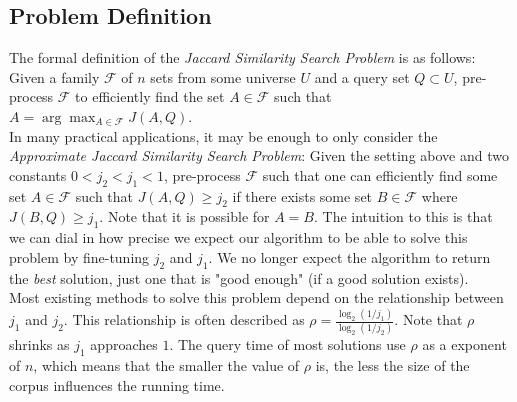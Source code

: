 \subsection{Problem Definition}
The formal definition of the \textit{Jaccard Similarity Search Problem} is as follows:
Given a family $\mathcal{F}$ of $n$ sets from some universe $U$ and a query set $Q\subset U$, pre-process $\mathcal{F}$ to efficiently find the set $A\in \mathcal{F}$ such that $A = \arg\max_{A\in \mathcal{F}}J(A,Q)$. \\
In many practical applications, it may be enough to only consider the \textit{Approximate Jaccard Similarity Search Problem}: Given the setting above and two constants $0 < j_2 < j_1 < 1$, pre-process $\mathcal{F}$ such that one can efficiently find some set $A \in \mathcal{F}$ such that $J(A,Q) \geq j_2$ if there exists some set $B \in \mathcal{F}$ where $J(B,Q) \geq j_1$. Note that it is possible for $A = B$. The intuition to this is that we can dial in how precise we expect our algorithm to be able to solve this problem by fine-tuning $j_2$ and $j_1$. We no longer expect the algorithm to return the \textit{best} solution, just one that is "good enough" (if a good solution exists). \\
Most existing methods to solve this problem depend on the relationship between $j_1$ and $j_2$. This relationship is often described as $\rho=\frac{\log_2(1/j_1)}{\log_2(1/j_2)}$. Note that $\rho$ shrinks as $j_1$ approaches $1$. The query time of most solutions use $\rho$ as a exponent of $n$, which means that the smaller the value of $\rho$ is, the less the size of the corpus influences the running time.

